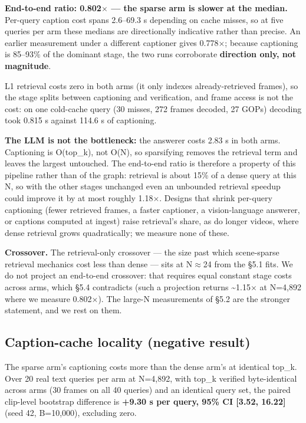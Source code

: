 \documentclass[sigconf,review,anonymous]{acmart}
\begin{document}
\textbf{End-to-end ratio: 0.802\ensuremath{\times} --- the sparse arm is slower at the median.} Per-query caption cost spans
2.6--69.3 s depending on cache misses, so at five queries per arm these medians are
directionally indicative rather than precise. An earlier measurement under a different
captioner gives 0.778\ensuremath{\times}; because captioning is 85--93\% of the dominant stage, the two runs
corroborate \textbf{direction only, not magnitude}.

L1 retrieval costs zero in both arms (it only indexes already-retrieved frames), so the stage
splits between captioning and verification, and frame access is not the cost: on one cold-cache
query (30 misses, 272 frames decoded, 27 GOPs) decoding took 0.815 s against 114.6 s of captioning.

\textbf{The LLM is not the bottleneck:} the answerer costs 2.83 s in both arms. Captioning is
O(top\_k), not O(N), so sparsifying removes the retrieval term and leaves the largest untouched.
The end-to-end ratio is therefore a property of this pipeline rather than of the graph: retrieval
is about 15\% of a dense query at this N, so with the other stages unchanged even an unbounded
retrieval speedup could improve it by at most roughly 1.18\ensuremath{\times}. Designs that shrink per-query
captioning (fewer retrieved frames, a faster captioner, a vision-language answerer, or captions
computed at ingest) raise retrieval's share, as do longer videos, where dense retrieval grows
quadratically; we measure none of these.

\textbf{Crossover.} The retrieval-only crossover --- the size past which scene-sparse retrieval
mechanics cost less than dense --- sits at N\ensuremath{\approx}24 from the §5.1 fits. We do not project an
end-to-end crossover: that requires equal constant stage costs across arms, which §5.4
contradicts (such a projection returns \textasciitilde1.15\ensuremath{\times} at N=4,892 where we measure 0.802\ensuremath{\times}). The
large-N measurements of §5.2 are the stronger statement, and we rest on them.

\subsection{Caption-cache locality (negative result)}

The sparse arm's captioning costs more than the dense arm's at identical top\_k. Over 20 real
text queries per arm at N=4,892, with top\_k verified byte-identical across arms (30 frames
on all 40 queries) and an identical query set, the paired clip-level bootstrap difference is
\textbf{+9.30 s per query, 95\% CI {[}3.52, 16.22{]}} (seed 42, B=10,000), excluding zero.
\end{document}
